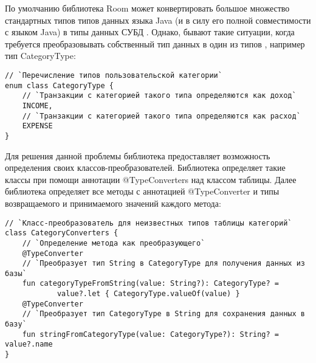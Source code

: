 По умолчанию библиотека Room может конвертировать большое множество стандартных типов типов данных языка Java (и \kt в силу его полной совместимости с языком Java) в типы данных СУБД \sqlite.
Однако, бывают такие ситуации, когда требуется преобразовывать собственный тип данных в один из типов \sqlite, например тип CategoryType:
\begin{lstlisting}[style=standard]
// `Перечисление типов пользовательской категории`
enum class CategoryType {
    // `Транзакции с категорией такого типа определяются как доход`
    INCOME,
    // `Транзакции с категорией такого типа определяются как расход`
    EXPENSE
}
\end{lstlisting}

Для решения данной проблемы библиотека предоставляет возможность определения своих классов-преобразователей.
Библиотека определяет такие классы при помощи аннотации @TypeConverters над классом таблицы.
Далее библиотека определяет все методы с аннотацией @TypeConverter и типы возвращаемого и принимаемого значений каждого метода:
\begin{lstlisting}[style=standard]
// `Класс-преобразователь для неизвестных типов таблицы категорий`
class CategoryConverters {
    // `Определение метода как преобразующего`
    @TypeConverter
    // `Преобразует тип String в CategoryType для получения данных из базы`
    fun categoryTypeFromString(value: String?): CategoryType? =
            value?.let { CategoryType.valueOf(value) }
    @TypeConverter
    // `Преобразует тип CategoryType в String для сохранения данных в базу`
    fun stringFromCategoryType(value: CategoryType?): String? = value?.name
}
\end{lstlisting}

